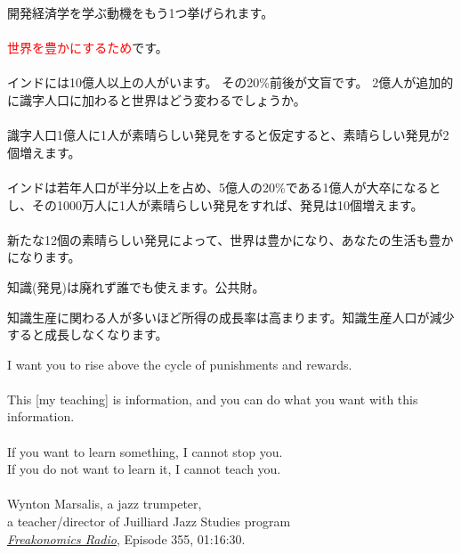 \begin{frame}[t, label=AnotherMotivation]{}
開発経済学を学ぶ動機をもう1つ挙げられます。\\~\\
\pause
\textcolor{red}{世界を豊かにするため}です。\\~\\
\pause
インドには10億人以上の人がいます。
\pause
その20\%前後が文盲です。
\pause
2億人が追加的に識字人口に加わると世界はどう変わるでしょうか。\\~\\
\pause
識字人口1億人に1人が素晴らしい発見をすると仮定すると、素晴らしい発見が2個増えます。\\~\\
\pause
インドは若年人口が半分以上を占め、5億人の20\%である1億人が大卒になるとし、その1000万人に1人が素晴らしい発見をすれば、発見は10個増えます。\\~\\
\pause
新たな12個の素晴らしい発見によって、世界は豊かになり、あなたの生活も豊かになります。
\begin{dinglist}{43}
\vspace{1.0ex}\setlength{\itemsep}{1.0ex}\setlength{\baselineskip}{12pt}
\pause
\item	知識(発見)は廃れず誰でも使えます。公共財。
\pause
\item	知識生産に関わる人が多いほど所得の成長率は高まります\citep{Kremer1993}。知識生産人口が減少すると成長しなくなります\citep{Jones2022}。
\end{dinglist}
\end{frame}

\begin{frame}{}
I want you to rise above the cycle of punishments and rewards.\\~\\
\pause
This [my teaching] is information, and you can do what you want with this information.\\~\\
\pause
If you want to learn something, I cannot stop you.\\
\pause
If you do not want to learn it, I cannot teach you.\\~\\

\pause
\hfill Wynton Marsalis, a jazz trumpeter,\\
\hfill a teacher/director of Juilliard Jazz Studies program\\
\hfill\href{http://freakonomics.com/archive/}{\textit{Freakonomics Radio}}, Episode 355, 01:16:30.
\end{frame}


